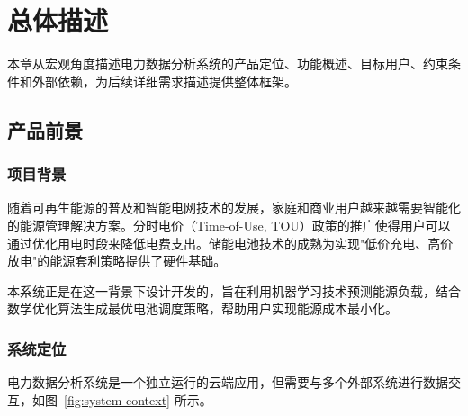 \chapter{总体描述}

本章从宏观角度描述电力数据分析系统的产品定位、功能概述、目标用户、约束条件和外部依赖，为后续详细需求描述提供整体框架。

\section{产品前景}

\subsection{项目背景}

随着可再生能源的普及和智能电网技术的发展，家庭和商业用户越来越需要智能化的能源管理解决方案。分时电价（Time-of-Use, TOU）政策的推广使得用户可以通过优化用电时段来降低电费支出。储能电池技术的成熟为实现"低价充电、高价放电"的能源套利策略提供了硬件基础。

本系统正是在这一背景下设计开发的，旨在利用机器学习技术预测能源负载，结合数学优化算法生成最优电池调度策略，帮助用户实现能源成本最小化。

\subsection{系统定位}

电力数据分析系统是一个独立运行的云端应用，但需要与多个外部系统进行数据交互，如图~\ref{fig:system-context} 所示。

